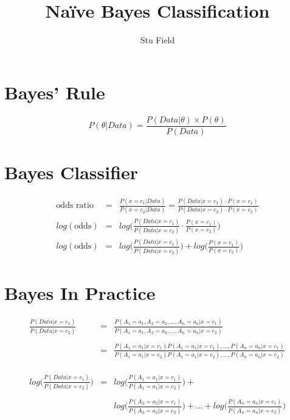 \documentclass[12pt]{article}
\title{Na\"ive Bayes Classification}
\author{Stu Field}
\date{}   %
\begin{document}
\maketitle


\section{Bayes' Rule}

\begin{equation}
	P(\theta | Data) = \frac{P(Data | \theta) \times P(\theta)}{P(Data)}
\end{equation}


\section{Bayes Classifier}

\begin{eqnarray*}
	\text{odds ratio} &=& \frac{P(x=c_1 | Data)}{P(x=c_2 | Data)} = \frac{P(Data | x=c_1) \cdot P(x=c_1)}{P(Data | x=c_2) \cdot P(x=c_2)} \\
	log(\text{odds}) &=& log\Bigg(\frac{P(Data | x=c_1)}{P(Data | x=c_2)} \cdot \frac{P(x=c_1)}{P(x=c_2)}\Bigg) \\
	log(\text{odds}) &=& log\bigg(\frac{P(Data | x=c_1)}{P(Data | x=c_2)}\bigg) + 
			log\bigg(\frac{P(x=c_1)}{P(x=c_2)}\bigg)
\end{eqnarray*}



\section{Bayes In Practice}

\begin{eqnarray*}
	\frac{P(Data | x=c_1)}{P(Data | x=c_2)} &=& 
		\frac{P(A_1=a_1, A_2=a_2,\dots,A_n=a_n|x=c_1)}
		 {P(A_1=a_1,A_2=a_2,\dots,A_n=a_n|x=c_2)} \\
		 \\
		&=& \frac{P(A_1=a_1|x=c_1) P(A_1=a_1|x=c_1),\dots,P(A_n=a_n|x=c_1)} 
		{P(A_1=a_1|x=c_2) P(A_1=a_1|x=c_2),\dots,P(A_n=a_n|x=c_2)} \\
		\\ \\ \\ 
	log\Bigg(\frac{P(Data | x=c_1)}{P(Data | x=c_2)}\Bigg) &=& 
			log\Bigg(\frac{P(A_1=a_1|x=c_1)}{P(A_1=a_1|x=c_2)}\Bigg) + \\
			\\
			&& log\Bigg(\frac{P(A_2=a_2|x=c_1)}{P(A_2=a_2|x=c_2)}\Bigg) + \dots + 
			log\Bigg(\frac{P(A_n=a_n|x=c_1)}{P(A_n=a_n|x=c_2)}\Bigg)
\end{eqnarray*}
\end{document}
